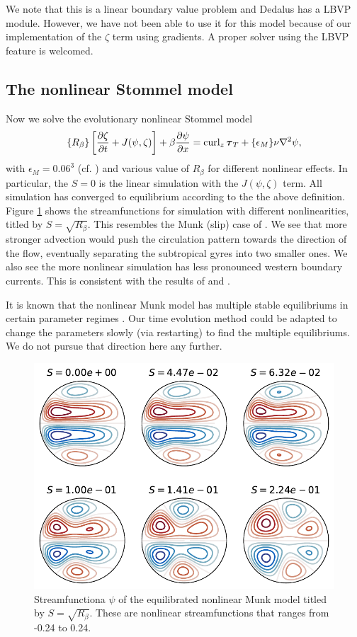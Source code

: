 We note that this is a linear boundary value problem and Dedalus has a LBVP module. However, we have not been able to use it for this model because of our implementation of the $\zeta$ term using gradients. A proper solver using the LBVP feature is welcomed.

\subsection{The nonlinear Stommel model}
Now we solve the evolutionary nonlinear Stommel model
\begin{align}
    \{R_\beta\}\left[\frac{\partial\zeta}{\partial t}+J(\psi,\zeta)\right]+\beta\frac{\partial\psi}{\partial x} = \operatorname{curl}_z\boldsymbol{\tau}_T+\{\epsilon_M\}\nu\nabla^2\psi,
\end{align}
with $\epsilon_M = 0.06^3$ (cf. \cite{IerleySheremet_95}) and various value of $R_\beta$ for different nonlinear effects. In particular, the $S=0$ is the linear simulation with the $J(\psi,\zeta)$ term. All simulation has converged to equilibrium according to the the above definition. Figure \ref{fig:Gyre_munk_zetaall} shows the streamfunctions for simulation with different nonlinearities, titled by $S = \sqrt{R_\beta}$. This resembles the Munk (slip) case of \cite[Fig. 19.11]{Vallis_17}. We see that more stronger advection would push the circulation pattern towards the direction of the flow, eventually separating the subtropical gyres into two smaller ones. We also see the more nonlinear simulation has less pronounced western boundary currents. This is consistent with the results of \cite[Fig. 19.11]{Vallis_17} and \cite[Figure 2]{IerleySheremet_95}.

It is known that the nonlinear Munk model has multiple stable equilibriums in certain parameter regimes \parencite{CessiIerley_95, IerleySheremet_95}. Our time evolution method could be adapted to change the parameters slowly (via restarting) to find the multiple equilibriums. We do not pursue that direction here any further.

\begin{figure}
    \centering
    \includegraphics{Gyre_munk_zetaall}
    \caption{Streamfunctiona $\psi$ of the equilibrated nonlinear Munk model titled by $S = \sqrt{R_\beta}$. These are nonlinear streamfunctions that ranges from -0.24 to 0.24.}
    \label{fig:Gyre_munk_zetaall}
\end{figure}